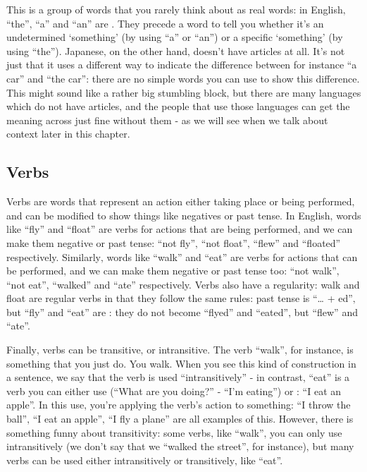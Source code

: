\documentclass[11pt, b5paper, twoside, openright, onecolumn]{book}
\begin{document}
This is a group of words that you rarely think about as real words: in English‚ “the”‚ “a” and “an” are . They precede a word to tell you whether it’s an undetermined ‘something’ (by using “a” or “an”) or a specific ‘something’ (by using “the”). Japanese‚ on the other hand‚ doesn’t have articles at all. It’s not just that it uses a different way to indicate the difference between for instance “a car” and “the car”: there are no simple words you can use to show this difference. This might sound like a rather big stumbling block‚ but there are many languages which do not have articles‚ and the people that use those languages can get the meaning across just fine without them - as we will see when we talk about context later in this chapter.

\subsection{Verbs}

Verbs are words that represent an action either taking place or being performed‚ and can be modified to show things like negatives or past tense. In English‚ words like “fly” and “float” are verbs for actions that are being performed‚ and we can make them negative or past tense: “not fly”‚ “not float”‚ “flew” and “floated” respectively. Similarly‚ words like “walk” and “eat” are verbs for actions that can be performed‚ and we can make them negative or past tense too: “not walk”‚ “not eat”‚ “walked” and “ate” respectively. Verbs also have a regularity: walk and float are regular verbs in that they follow the same rules: past tense is “… + ed”‚ but “fly” and “eat” are : they do not become “flyed” and “eated”‚ but “flew” and “ate”.

Finally‚ verbs can be transitive‚ or intransitive. The verb “walk”‚ for instance‚ is something that you just do. You walk. When you see this kind of construction in a sentence‚ we say that the verb is used “intransitively” - in contrast‚ “eat” is a verb you can either use  (“What are you doing?” - “I’m eating”) or : “I eat an apple”. In this use‚ you’re applying the verb’s action to something: “I throw the ball”‚ “I eat an apple”‚ “I fly a plane” are all examples of this. However‚ there is something funny about transitivity: some verbs‚ like “walk”‚ you can only use intransitively (we don’t say that we “walked the street”‚ for instance)‚ but many verbs can be used either intransitively or transitively‚ like “eat”.
\end{document}

